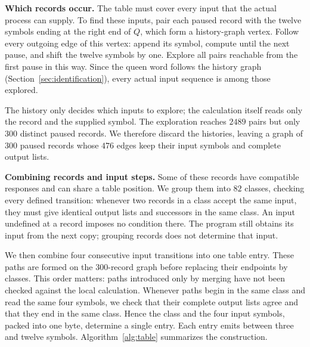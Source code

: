 \medskip\noindent
\textbf{Which records occur.}
The table must cover every input that the actual process can supply.
To find these inputs, pair each paused record with the twelve symbols
ending at the right end of $Q$, which form a history-graph vertex.
Follow every outgoing edge of this vertex: append its symbol, compute
until the next pause, and shift the twelve symbols by one. Explore
all pairs reachable from the first pause in this way. Since the queen
word follows the history graph (Section~\ref{sec:identification}),
every actual input sequence is among those explored.

The history only decides which inputs to explore; the calculation
itself reads only the record and the supplied symbol. The exploration
reaches $2489$ pairs but only $300$ distinct paused records. We
therefore discard the histories, leaving a graph of $300$ paused
records whose $476$ edges keep their input symbols and complete
output lists.

\medskip\noindent
\textbf{Combining records and input steps.}
Some of these records have compatible responses and can share a table
position. We group them into $82$ classes, checking every defined
transition: whenever two records in a class accept the same input,
they must give identical output lists and successors in the same
class. An input undefined at a record imposes no condition there. The
program still obtains its input from the next copy; grouping records
does not determine that input.

We then combine four consecutive input transitions into one table
entry. These paths are formed on the $300$-record graph before
replacing their endpoints by classes. This order matters: paths
introduced only by merging have not been checked against the local
calculation. Whenever paths begin in the same class and read the same
four symbols, we check that their complete output lists agree and
that they end in the same class. Hence the class and the four input
symbols, packed into one byte, determine a single entry. Each entry
emits between three and twelve symbols. Algorithm~\ref{alg:table}
summarizes the construction.

